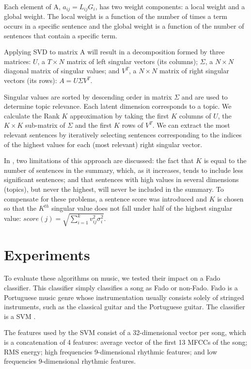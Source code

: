 \documentclass[11pt,onecolumn,draftcls]{IEEEtran}
\begin{document}
Each element of A, $a_{ij}=L_{ij}G_{i}$, has two weight components: a local
weight and a global weight. The local weight is a function of the number of
times a term occurs in a specific sentence and the global weight is a function
of the number of sentences that contain a specific term.

Applying \ac{SVD} to matrix A will result in a decomposition formed by three
matrices: $U$, a $T\times N$ matrix of left singular vectors (its columns);
$\Sigma$, a $N\times N$ diagonal matrix of singular values; and $V^{T}$, a
$N\times N$ matrix of right singular vectors (its rows): $A=U\Sigma V^{T}$.

Singular values are sorted by descending order in matrix $\Sigma$ and are used
to determine topic relevance. Each latent dimension corresponds to a topic. We
calculate the Rank $K$ approximation by taking the first $K$ columns of $U$, the
$K\times K$ sub-matrix of $\Sigma$ and the first $K$ rows of $V^{T}$. We can
extract the most relevant sentences by iteratively selecting sentences
corresponding to the indices of the highest values for each (most relevant)
right singular vector.

In \cite{Steinberger2004}, two limitations of this approach are discussed:
the fact that $K$ is equal to the number of sentences in the summary, which, as
it increases, tends to include less significant sentences; and that sentences
with high values in several dimensions (topics), but never the highest, will
never be included in the summary. To compensate for these problems, a sentence
score was introduced and $K$ is chosen so that the $K^{th}$ singular value does
not fall under half of the highest singular value:
$score\left(j\right)=\sqrt{\sum_{i=1}^{k}v_{ij}^{2}\sigma_{i}^{2}}$.

\section{Experiments\label{sec:experiments}}
To evaluate these algorithms on music, we tested their impact on a Fado
classifier. This classifier simply classifies a song as Fado or non-Fado. Fado
is a Portuguese music genre whose instrumentation usually consists solely of
stringed instruments, such as the classical guitar and the Portuguese guitar.
The classifier is a \ac{SVM} \cite{Chang2011}.

The features used by the \ac{SVM} consist of a 32-dimensional vector per song,
which is a concatenation of 4 features: average vector of the first 13
\ac{MFCC}s of the song; \ac{RMS} energy; high frequencies 9-dimensional
rhythmic features; and low frequencies 9-dimensional rhythmic features.
\end{document}
